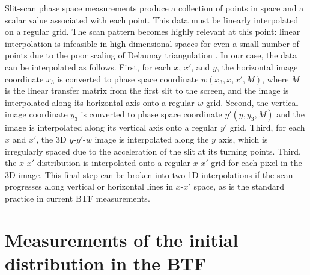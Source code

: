 \documentclass[letterpaper,
               keeplastbox,
               nospread,
               biblatex,
              ]{jacow}
\begin{document}
Slit-scan phase space measurements produce a collection of points in space and a scalar value associated with each point. This data must be linearly interpolated on a regular grid. The scan pattern becomes highly relevant at this point: linear interpolation is infeasible in high-dimensional spaces for even a small number of points due to the poor scaling of Delaunay triangulation \cite{}. In our case, the data can be interpolated as follows. First, for each $x$, $x'$, and $y$, the horizontal image coordinate $x_3$ is converted to phase space coordinate $w(x_3, x, x', M)$, where $M$ is the linear transfer matrix from the first slit to the screen, and the image is interpolated along its horizontal axis onto a regular $w$ grid. Second, the vertical image coordinate $y_3$ is converted to phase space coordinate $y'(y, y_3, M)$ and the image is interpolated along its vertical axis onto a regular $y'$ grid. Third, for each $x$ and $x'$, the 3D $y$-$y'$-$w$ image is interpolated along the $y$ axis, which is irregularly spaced due to the acceleration of the slit at its turning points. Third, the $x$-$x'$ distribution is interpolated onto a regular $x$-$x'$ grid for each pixel in the 3D image. This final step can be broken into two 1D interpolations if the scan progresses along vertical or horizontal lines in $x$-$x'$ space, as is the standard practice in current BTF measurements.




\section{Measurements of the initial distribution in the BTF}
\end{document}
